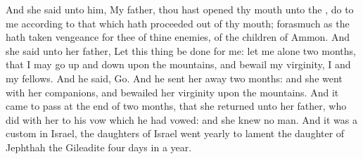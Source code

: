 {And she
said unto him, My
father,
{} thou hast
opened thy
mouth unto the
{},
do to me according to that
which hath
proceeded out of thy
mouth;
forasmuch as the
{} hath
taken
vengeance for thee of thine
enemies,
{} of the
children of
Ammon.
And she
said unto her
father, Let this
thing be
done for me: let me
alone
two
months, that I may go
up and
down upon the
mountains, and
bewail my
virginity, I and my
fellows.
And he
said,
Go. And he sent her
away
{}
two
months: and she
went with her
companions, and
bewailed her
virginity upon the
mountains.
And it came to pass at the
end of
two
months, that she
returned unto her
father, who
did with her
{} to his
vow which he had
vowed: and she
knew no
man. And it was a
custom in
Israel,
 the
daughters of
Israel
went
yearly to
lament the
daughter of
Jephthah the
Gileadite
four
days in a
year.

}

